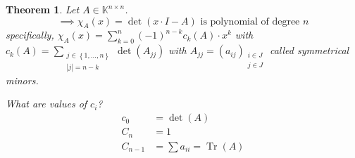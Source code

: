 \documentclass{article}
\newtheorem{theorem}{Theorem}  \numberwithin{theorem}{section}
\newcommand{\set}[1]{\left\{#1\right\}}
\begin{document}
\begin{theorem} %
  Let $A \in \mathbb K^{n \times n}$.
  \[ \implies \chi_A(x) = \det(x \cdot I - A) \text{ is polynomial of degree } n \]
  specifically, $\chi_A(x) = \sum_{k=0}^n (-1)^{n-k} c_k(A) \cdot x^k$ with $c_k(A) = \sum_{\substack{j \in \set{1, \dots, n} \\ |j| = n - k}} \det(A_{jj})$
  with $A_{jj} = (a_{ij})_{\substack{i \in J \\ j \in J}}$ called \emph{symmetrical minors}.

  What are values of $c_i$?
  \begin{align*}
    c_0 &= \det(A) \\
    C_n &= 1 \\
    C_{n-1} &= \sum a_{ii} = \operatorname{Tr}(A)
  \end{align*}
\end{theorem}
\end{document}
